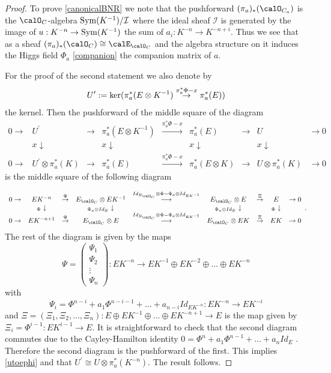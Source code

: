 \begin{proof}  To prove \eqref{canonicalBNR} we note that the pushforward $(\pi_a)_*(\calO_{C_a})$ is the $\calO_C$-algebra ${\rm Sym}(K^{-1})/{\mathcal I}$ where the ideal sheaf ${\mathcal I}$ is generated by the image of $u:K^{-n}\to {\rm Sym}(K^{-1})$ the sum  of $a_i:K^{-n}\to K^{-n+i}$. Thus we see that as a sheaf $(\pi_a)_*(\calO_C)\cong \calE_{\calO_C}$ and the algebra structure on it induces the Higgs field $\Phi_a$ \eqref{companion}  the companion matrix of $a$.


	For the proof of the second statement we also denote
	by $$U^\prime:={\rm ker}(\pi_a^*(E\otimes K^{-1})\stackrel{\pi_a^*\Phi-x}{\to} \pi_a^*(E))$$ the kernel. Then the pushforward of the middle square of
	the diagram $$\begin{array}{ccccccccc} 0\to  &U^\prime& \to &\pi_a^*(E\otimes K^{-1})&\stackrel{\pi_a^*\Phi-x}{\to} &\pi_a^*(E) &\to &U& \to 0 \\  & x \downarrow    &&   x \downarrow  &&  x \downarrow     &&   x \downarrow   & \\ 0\to  &U^\prime\otimes \pi_a^*(K)& \to &\pi_a^*(E)&\stackrel{\pi_a^*\Phi-x}{\to} &\pi_a^*(E\otimes K) &\to &U\otimes \pi_a^*(K) & \to 0 \end{array}$$
	is the middle square of the following diagram

	$$\begin{array}{ccccccccc} 0\to  &EK^{-n}& \stackrel{\Psi}{\to }&E_{\calO_C}\otimes E K^{-1}&\stackrel{Id_{E_{\calO_C}} \otimes \Phi-\Phi_a\otimes Id_{EK^{-1}} }{\longrightarrow} &E_{\calO_C}\otimes E &\stackrel{\Xi}{\to }&E& \to 0 \\  & _\Phi \downarrow    &&   _{\Phi_a\otimes Id_E} \downarrow  &&   _{\Phi_a\otimes Id_E} \downarrow     &&   _\Phi \downarrow   & \\ 0\to  &EK^{-n+1}&  \stackrel{\Psi}{\to} &E_{\calO_C}\otimes E&\stackrel{Id_{E_{\calO_C}} \otimes \Phi-\Phi_a\otimes Id_{EK^{-1}} }{\longrightarrow} &E_{\calO_C}\otimes EK &\stackrel{\Xi}{\to} &E K & \to 0 \end{array}.$$ The rest of the diagram is given by the maps
	$$\Psi=\left(\begin{array}{c} \Psi_1\\ \Psi_2 \\ \vdots \\ \Psi_n \end{array}\right):EK^{-n}\to EK^{-1}\oplus EK^{-2}\oplus \dots \oplus EK^{-n}$$  with  $$\Psi_i=\Phi^{n-i}+a_1 \Phi^{n-i-1}+\dots + a_{n-i} Id_{EK^{-n}}:EK^{-n}\to EK^{-i}$$ and $\Xi=(\Xi_1,\Xi_2,\dots,\Xi_n): E\oplus EK^{-1}\oplus \dots \oplus EK^{-n+1}\to E$ is the map given by $\Xi_i=\Phi^{i-1}:EK^{i-1}\to E$. It is straightforward to check that the second  diagram commutes due to the Cayley-Hamilton identity $0=\Phi^n+a_1\Phi^{n-1}+\dots + a_{n} Id_E$ .  Therefore the second diagram is the pushforward of the first. This implies  \eqref{utoephi} and that $U^\prime\cong U\otimes \pi_a^*(K^{-n})$.  The result follows.
\end{proof}



